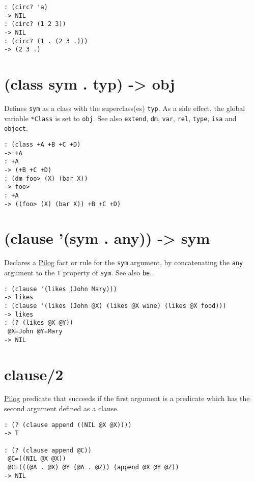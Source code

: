 {\begin{verbatim}
: (circ? 'a)
-> NIL
: (circ? (1 2 3))
-> NIL
: (circ? (1 . (2 3 .)))
-> (2 3 .)
\end{verbatim}

 
\section{(class sym . typ) -> obj}
\label{sec-8-1-3-20}


Defines \texttt{sym} as a class with the superclass(es) \texttt{typ}. As a side
effect, the global variable \texttt{*Class} is set to \texttt{obj}. See also \texttt{extend},
\texttt{dm}, \texttt{var}, \texttt{rel}, \texttt{type}, \texttt{isa} and \texttt{object}.


\begin{verbatim}
: (class +A +B +C +D)
-> +A
: +A
-> (+B +C +D)
: (dm foo> (X) (bar X))
-> foo>
: +A
-> ((foo> (X) (bar X)) +B +C +D)
\end{verbatim}

 
\section{(clause '(sym . any)) -> sym}
\label{sec-8-1-3-21}


Declares a \hyperref[ref.html-pilog]{Pilog} fact or rule for the \texttt{sym}
argument, by concatenating the \texttt{any} argument to the \texttt{T} property of
\texttt{sym}. See also \texttt{be}.


\begin{verbatim}
: (clause '(likes (John Mary)))
-> likes
: (clause '(likes (John @X) (likes @X wine) (likes @X food)))
-> likes
: (? (likes @X @Y))
 @X=John @Y=Mary
-> NIL
\end{verbatim}

 
\section{clause/2}
\label{sec-8-1-3-22}


\hyperref[ref.html-pilog]{Pilog} predicate that succeeds if the first argument
is a predicate which has the second argument defined as a clause.


\begin{verbatim}
: (? (clause append ((NIL @X @X))))
-> T

: (? (clause append @C))
 @C=((NIL @X @X))
 @C=(((@A . @X) @Y (@A . @Z)) (append @X @Y @Z))
-> NIL
\end{verbatim}

}
